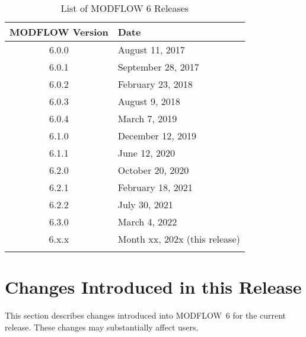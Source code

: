 \documentclass[11pt,twoside,twocolumn]{usgsreport}
\begin{document}
\begin{table}[h]
\begin{center}
\caption{List of MODFLOW 6 Releases}
\small 
\begin{tabular*}{12cm}{cl}
\hline
\hline
\textbf{MODFLOW Version} & \textbf{Date}\\
\hline
6.0.0 & August 11, 2017 \\
6.0.1 & September 28, 2017 \\
6.0.2 & February 23, 2018 \\
6.0.3 & August 9, 2018 \\
6.0.4 & March 7, 2019 \\
6.1.0 & December 12, 2019 \\
6.1.1 & June 12, 2020 \\
6.2.0 & October 20, 2020 \\
6.2.1 & February 18, 2021 \\
6.2.2 & July 30, 2021 \\
6.3.0 & March 4, 2022 \\
6.x.x & Month xx, 202x (this release) \\
\hline
\label{tab:releases}
\end{tabular*}
\end{center}
\normalsize
\end{table}


\section{Changes Introduced in this Release}
This section describes changes introduced into MODFLOW~6 for the current release.  These changes may substantially affect users.
\end{document}
